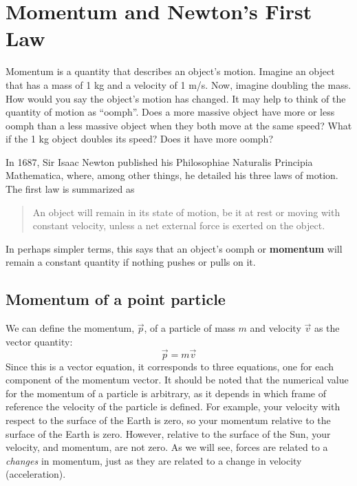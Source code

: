 \documentclass[9pt,arxiv,red]{lapreprint}
\begin{document}
\section{Momentum and Newton's First Law}

Momentum is a quantity that describes an object's motion. Imagine an object that has a mass of 1 kg and a velocity of 1 m/s. Now, imagine doubling the mass. How would you say the object's motion has changed. It may help to think of the quantity of motion as ``oomph''. Does a more massive object have more or less oomph than a less massive object when they both move at the same speed? What if the 1 kg object doubles its speed? Does it have more oomph?

In 1687, Sir Isaac Newton published his Philosophiae Naturalis Principia Mathematica, where, among other things, he detailed his three laws of motion. The first law is summarized as

\begin{quote}
An object will remain in its state of motion, be it at rest or moving with constant velocity, unless a net external force is exerted on the object.
\end{quote}

In perhaps simpler terms, this says that an object's oomph or \textbf{momentum} will remain a constant quantity if nothing pushes or pulls on it.

\subsection{Momentum of a point particle}

We can define the momentum, $\vec p$, of a particle of mass $m$ and velocity $\vec v$ as the vector quantity:
\begin{equation}
\boxed{\vec p = m\vec v}
\end{equation}
Since this is a vector equation, it corresponds to three equations, one for each component of the momentum vector. It should be noted that the numerical value for the momentum of a particle is arbitrary, as it depends in which frame of reference the velocity of the particle is defined. For example, your velocity with respect to the surface of the Earth is zero, so your momentum relative to the surface of the Earth is zero. However, relative to the surface of the Sun, your velocity, and momentum, are not zero. As we will see, forces are related to a \textit{changes} in momentum, just as they are related to a change in velocity (acceleration).
\end{document}
